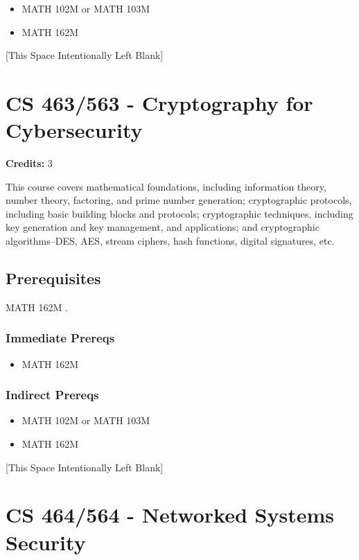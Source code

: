 \documentclass[]{article}
\providecommand{\tightlist}{%
  \setlength{\itemsep}{0pt}\setlength{\parskip}{0pt}}
\newcommand{\pagebreakhere}{
\vspace*{\fill}
\begin{center}
[This Space Intentionally Left Blank]
\end{center}
\vspace*{\fill}
\newpage
}
\begin{document}
\begin{itemize}
\tightlist
\item
  MATH 102M or MATH 103M
\item
  MATH 162M
\end{itemize}

\pagebreakhere
\section{CS 463/563 - Cryptography for
Cybersecurity}\label{cs-463563---cryptography-for-cybersecurity}

\textbf{Credits:} 3

This course covers mathematical foundations, including information
theory, number theory, factoring, and prime number generation;
cryptographic protocols, including basic building blocks and protocols;
cryptographic techniques, including key generation and key management,
and applications; and cryptographic algorithms--DES, AES, stream
ciphers, hash functions, digital signatures, etc.

\subsection{Prerequisites}\label{prerequisites-40}

MATH 162M .

\subsubsection{Immediate Prereqs}\label{immediate-prereqs-31}

\begin{itemize}
\tightlist
\item
  MATH 162M
\end{itemize}

\subsubsection{Indirect Prereqs}\label{indirect-prereqs-31}

\begin{itemize}
\tightlist
\item
  MATH 102M or MATH 103M
\item
  MATH 162M
\end{itemize}

\pagebreakhere
\section{CS 464/564 - Networked Systems
Security}\label{cs-464564---networked-systems-security}
\end{document}
